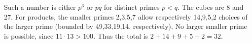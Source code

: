 Such a number is either $p^3$ or $pq$ for distinct primes $p<q$. The cubes are 8 and 27. For products, the smaller primes 2,3,5,7 allow respectively 14,9,5,2 choices of the larger prime (bounded by 49,33,19,14, respectively). No larger smaller prime is possible, since $11\cdot13>100$. Thus the total is $2+14+9+5+2=\boxed{32}$.
